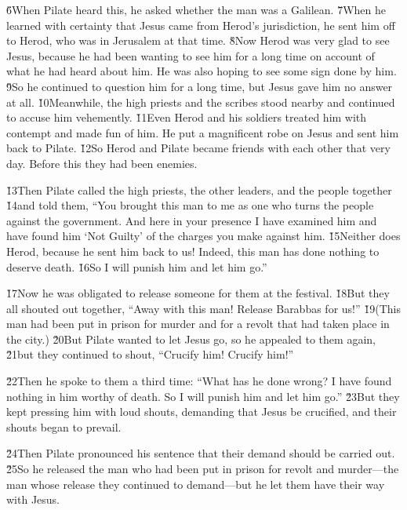 \v{6}When Pilate heard this, he asked whether the man was a Galilean. \v{7}When he learned with certainty that Jesus came from Herod's jurisdiction, he sent him off to Herod, who was in Jerusalem at that time. \v{8}Now Herod was very glad to see Jesus, because he had been wanting to see him for a long time on account of what he had heard about him. He was also hoping to see some sign done by him. \v{9}So he continued to question him for a long time, but Jesus gave him no answer at all. \v{10}Meanwhile, the high priests and the scribes stood nearby and continued to accuse him vehemently. \v{11}Even Herod and his soldiers treated him with contempt and made fun of him. He put a magnificent robe on Jesus and sent him back to Pilate. \v{12}So Herod and Pilate became friends with each other that very day. Before this they had been enemies.

\v{13}Then Pilate called the high priests, the other leaders, and the people together \v{14}and told them, ``You brought this man to me as one who turns the people against the government. And here in your presence I have examined him and have found him `Not Guilty' of the charges you make against him. \v{15}Neither does Herod, because he sent him back to us! Indeed, this man has done nothing to deserve death. \v{16}So I will punish him and let him go.''

\v{17}Now he was obligated to release someone for them at the festival. \v{18}But they all shouted out together, ``Away with this man! Release Barabbas for us!'' \v{19}(This man had been put in prison for murder and for a revolt that had taken place in the city.) \v{20}But Pilate wanted to let Jesus go, so he appealed to them again, \v{21}but they continued to shout, ``Crucify him! Crucify him!''

\v{22}Then he spoke to them a third time: ``What has he done wrong? I have found nothing in him worthy of death. So I will punish him and let him go.'' \v{23}But they kept pressing him with loud shouts, demanding that Jesus be crucified, and their shouts began to prevail.

\v{24}Then Pilate pronounced his sentence that their demand should be carried out. \v{25}So he released the man who had been put in prison for revolt and murder---the man whose release they continued to demand---but he let them have their way with Jesus.

